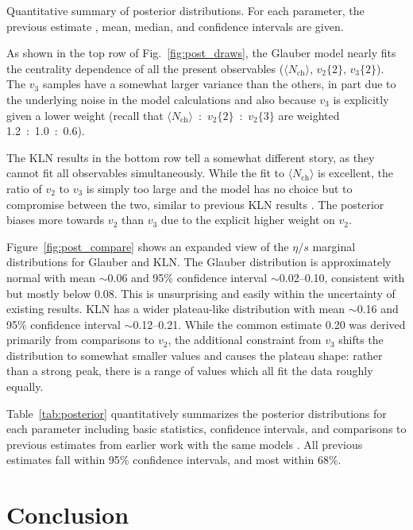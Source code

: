 \documentclass[aps,prc,reprint,superscriptaddress,amsmath]{revtex4-1}
\newcommand{\avg}[1]{\langle #1 \rangle}
\newcommand{\nch}{N_\text{ch}}
\newcommand{\vnk}[2]{v_#1\{#2\}}
\begin{document}
\begin{table*}
  \caption{
    \label{tab:posterior}
    Quantitative summary of posterior distributions.
    For each parameter, the previous estimate \cite{Shen:2011zc,Heinz:2011kt,Shen:2013pc}, mean, median, and confidence intervals are given.
  }
  
\end{table*}

As shown in the top row of Fig.~\ref{fig:post_draws}, the Glauber model nearly fits the centrality dependence of all the present observables ($\avg\nch$, $\vnk 2 2$, $\vnk 3 2$).
The $v_3$ samples have a somewhat larger variance than the others, in part due to the underlying noise in the model calculations and also because $v_3$ is explicitly given a lower weight (recall that $\avg\nch$~:~$\vnk 2 2$~:~$\vnk 2 3$ are weighted 1.2~:~1.0~:~0.6).

The KLN results in the bottom row tell a somewhat different story, as they cannot fit all observables simultaneously.
While the fit to $\avg\nch$ is excellent, the ratio of $v_2$ to $v_3$ is simply too large and the model has no choice but to compromise between the two, similar to previous KLN results \cite{Qiu:2011hf}.
The posterior biases more towards $v_2$ than $v_3$ due to the explicit higher weight on $v_2$.

Figure~\ref{fig:post_compare} shows an expanded view of the $\eta/s$ marginal distributions for Glauber and KLN.
The Glauber distribution is approximately normal with mean ${\sim}$0.06 and 95\% confidence interval ${\sim}$0.02--0.10, consistent with but mostly below 0.08.
This is unsurprising and easily within the uncertainty of existing results.
KLN has a wider plateau-like distribution with mean ${\sim}$0.16 and 95\% confidence interval ${\sim}$0.12--0.21.
While the common estimate 0.20 was derived primarily from comparisons to $v_2$, the additional constraint from $v_3$ shifts the distribution to somewhat smaller values and causes the plateau shape:
rather than a strong peak, there is a range of values which all fit the data roughly equally.

Table~\ref{tab:posterior} quantitatively summarizes the posterior distributions for each parameter including basic statistics, confidence intervals, and comparisons to previous estimates from earlier work with the same models \cite{Shen:2011zc,Heinz:2011kt,Shen:2013pc}.
All previous estimates fall within 95\% confidence intervals, and most within 68\%.



\section{Conclusion}
\end{document}
